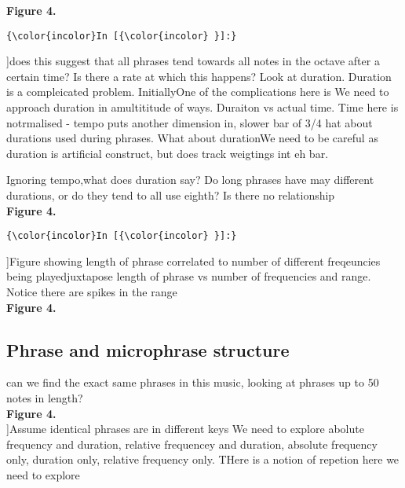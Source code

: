 \documentclass[11pt]{article}
\begin{document}
\noindent
\textbf{Figure 4.}
\\
    \begin{Verbatim}[commandchars=\\\{\}]
{\color{incolor}In [{\color{incolor} }]:} 
\end{Verbatim}
\vspace{5mm} 
\noindent
[[ correlation between length of phrase and different types of pitches shown - grouped showing octave/non octave / phrase count but browken down by songs ]]does this suggest that all phrases tend towards all notes in the octave after a certain time? Is there a rate at which this happens? Look at duration. Duration is a compleicated problem. InitiallyOne of the complications here is We need to approach duration in amultititude of ways. Duraiton vs actual time. Time here is notrmalised - tempo puts another dimension in, slower bar of 3/4 hat about durations used during phrases. What about durationWe need to be careful as duration is artificial construct, but does track weigtings int eh bar.

\noindent
Ignoring tempo,what does duration say? Do long phrases have may different durations, or do they tend to all use eighth? Is there no relationship
\\

\noindent
\textbf{Figure 4.}
\\
    \begin{Verbatim}[commandchars=\\\{\}]
{\color{incolor}In [{\color{incolor} }]:} 
\end{Verbatim}
\vspace{5mm} 
\noindent
[[histograph of phrase length grouped with count of duration types]]Figure showing length of phrase correlated to number of different freqeuncies being playedjuxtapose length of phrase vs number of frequencies and range. Notice there are spikes in the range
\\

\noindent
\textbf{Figure 4.}
\\\vspace{5mm} 
\subsection{Phrase and microphrase structure}

\noindent
can we find the exact same phrases in this music, looking at phrases up to 50 notes in length?
\\

\noindent
\textbf{Figure 4.}
\\
\vspace{5mm} 
\noindent
[[different phrases]]Assume identical phrases are in different keys We need to explore abolute frequency and duration, relative frequencey and duration, absolute frequency only, duration only, relative frequency only. THere is a notion of repetion here we need to explore
\\
\end{document}
